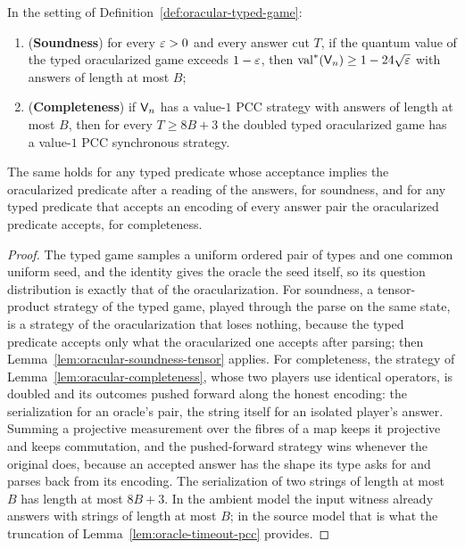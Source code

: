 \begin{lemma}
\label{lem:oracular-typed-transfers}
\leanok
In the setting of Definition~\ref{def:oracular-typed-game}:
\begin{enumerate}
\item (\textbf{Soundness}) for every $\varepsilon > 0$ and every answer cut $T$, if the quantum value of
  the typed oracularized game exceeds $1 - \varepsilon$, then $\mathrm{val}^*(\mathsf{V}_n) \geq 1 - 24\sqrt{\varepsilon}$
  with answers of length at most $B$;
\item (\textbf{Completeness}) if $\mathsf{V}_n$ has a value-$1$ PCC strategy with answers of length
  at most $B$, then for every $T \geq 8B + 3$ the doubled typed oracularized game has a value-$1$
  PCC synchronous strategy.
\end{enumerate}
The same holds for any typed predicate whose acceptance implies the oracularized predicate after a
reading of the answers, for soundness, and for any typed predicate that accepts an encoding of every
answer pair the oracularized predicate accepts, for completeness.
\end{lemma}
\begin{proof}
\leanok
The typed game samples a uniform ordered pair of types and one common uniform seed, and the
identity gives the oracle the seed itself, so its question distribution is exactly that of the
oracularization. For soundness, a tensor-product strategy of the typed game, played through the
parse on the same state, is a strategy of the oracularization that loses nothing, because the
typed predicate accepts only what the oracularized one accepts after parsing; then
Lemma~\ref{lem:oracular-soundness-tensor} applies. For completeness, the strategy of
Lemma~\ref{lem:oracular-completeness}, whose two players use identical operators, is doubled and
its outcomes pushed forward along the honest encoding: the serialization for an oracle's pair, the
string itself for an isolated player's answer. Summing a projective measurement over the fibres of
a map keeps it projective and keeps commutation, and the pushed-forward strategy wins whenever the
original does, because an accepted answer has the shape its type asks for and parses back from its
encoding. The serialization of two strings of length at most $B$ has length at most $8B + 3$. In
the ambient model the input witness already answers with strings of length at most $B$; in the
source model that is what the truncation of Lemma~\ref{lem:oracle-timeout-pcc} provides.
\end{proof}

